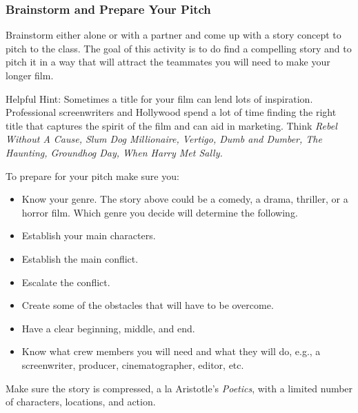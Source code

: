 \documentclass[
]{book}
\providecommand{\tightlist}{%
  \setlength{\itemsep}{0pt}\setlength{\parskip}{0pt}}
\begin{document}
\begin{reflect}
\hypertarget{brainstorm-and-prepare-your-pitch}{%
\subsubsection*{Brainstorm and Prepare Your Pitch}\label{brainstorm-and-prepare-your-pitch}}

Brainstorm either alone or with a partner and come up with a story concept to pitch to the class. The goal of this activity is to do find a compelling story and to pitch it in a way that will attract the teammates you will need to make your longer film.

Helpful Hint: Sometimes a title for your film can lend lots of inspiration. Professional screenwriters and Hollywood spend a lot of time finding the right title that captures the spirit of the film and can aid in marketing. Think \emph{Rebel Without A Cause, Slum Dog Millionaire, Vertigo, Dumb and Dumber, The
Haunting, Groundhog Day, When Harry Met Sally.}

To prepare for your pitch make sure you:

\begin{itemize}
\tightlist
\item
  Know your genre. The story above could be a comedy, a drama, thriller, or a horror film. Which genre you decide will determine the following.\\
\item
  Establish your main characters.\\
\item
  Establish the main conflict.\\
\item
  Escalate the conflict.\\
\item
  Create some of the obstacles that will have to be overcome.\\
\item
  Have a clear beginning, middle, and end.\\
\item
  Know what crew members you will need and what they will do, e.g., a screenwriter, producer, cinematographer, editor, etc.
\end{itemize}

Make sure the story is compressed, a la Aristotle's \emph{Poetics}, with a limited number of characters, locations, and action.
\end{reflect}
\end{document}
